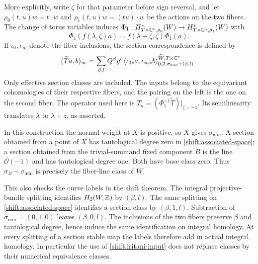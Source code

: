 More explicitly, write $\zeta$ for that parameter before sign
reversal, and let $\rho_0(t,u)w=t\cdot w$ and
$\rho_1(t,u)w=(tu)\cdot w$ be the actions on the two fibers.  The
change of torus variables induces
$\Phi_1:H^*_{T\times\mathbb C^*,\rho_0}(W)\to
H^*_{T\times\mathbb C^*,\rho_1}(W)$ with
\[
 \Phi_1(f(\lambda,\zeta)a)
       =f(\lambda+\zeta,\zeta)\Phi_1(a).
\]
If $\iota_0,\iota_\infty$ denote the fiber inclusions, the section
correspondence is defined by
\begin{equation}
 (\widetilde T a,b)_\infty
  =\sum_{\beta,l}Q^\beta y^l
     \left\langle\iota_{0*}a,\iota_{\infty*}b
       \right\rangle^{\widehat W,T\times\mathbb C^*}
       _{0,2,\sigma_{\min}+(\beta,l)}.
 \label{shift:section-definition}
\end{equation}
Only effective section classes are included.  The inputs belong to
the equivariant cohomologies of their respective fibers, and the
pairing on the left is the one on the second fiber.  The operator
used here is $T_a=(\Phi_1^{-1}\widetilde T)|_{\zeta=-z}$.
Its semilinearity translates $\lambda$ to $\lambda+z$, as asserted.

In this construction the normal weight at $X$ is positive, so $X$
gives $\sigma_{\min}$.  A section obtained from a point of $X$ has
tautological degree zero in \eqref{shift:associated-space}; a section
obtained from the trivial-summand fixed component $B$ is the line
$\mathcal O(-1)$ and has tautological degree one.  Both have base
class zero.  Thus
$\sigma_B-\sigma_{\min}$ is precisely the fiber-line class of $W$.

This also checks the curve labels in the shift theorem.  The integral
projective-bundle splitting identifies $H_2(W,\mathbb Z)$ by
$(\beta,l)$.  The same splitting on \eqref{shift:associated-space}
identifies a section class by $(\beta,1,l)$.  Subtraction of
$\sigma_{\min}=(0,1,0)$ leaves $(\beta,0,l)$.  The inclusions of
the two fibers preserve $\beta$ and tautological degree, hence induce
the same identification on integral homology.  At every splitting
of a section stable map the labels therefore add in actual integral
homology.  In particular the use of \eqref{shift:iritani-input}
does not replace classes by their numerical equivalence classes.

